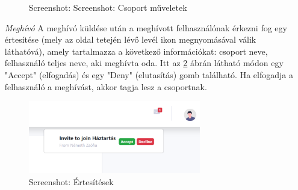 \begin{itemize}
\begin{figure}[H]
		\caption{Screenshot: Screenshot: Csoport műveletek}
		\label{fig:group-actions}
	\end{figure}
	\item[\emph{Meghívó}] A meghívó küldése után a meghívott felhasználónak érkezni fog egy értesítése (mely az oldal tetején lévő levél ikon megnyomásával válik láthatóvá), amely tartalmazza a következő információkat: csoport neve, felhasználó teljes neve, aki meghívta oda. Itt az \ref{fig:notification} ábrán látható módon egy "Accept" (elfogadás) és egy "Deny" (elutasítás) gomb található. Ha elfogadja a felhasználó a meghívást, akkor tagja lesz a csoportnak. 
	\begin{figure}[H]
		\centering
		\includegraphics[height=120px]{img/invite}
		\caption{Screenshot: Értesítések}
		\label{fig:notification}
	\end{figure}
\end{itemize}